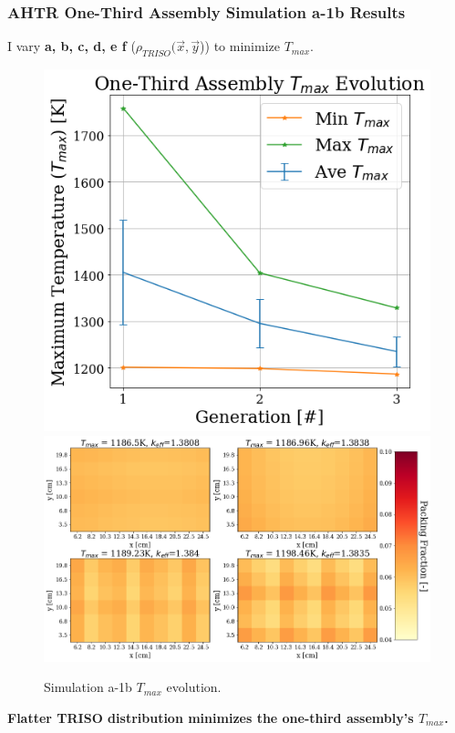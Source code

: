 \begin{frame}
    \frametitle{AHTR One-Third Assembly Simulation a-1b Results}
    I vary \textbf{a, b, c, d, e f} ($\rho_{TRISO}(\vec{x}, \vec{y}$))
    to minimize $T_{max}$. 
    \begin{figure}
        \includegraphics[width=0.39\linewidth]{figures/assem-obj-1-temp-evol-pres.png} 
        \includegraphics[width=0.59\linewidth]{../docs/figures/assem-obj-1-temp-final.png}
        \caption{Simulation a-1b $T_{max}$ evolution.}
    \end{figure}
    \textbf{Flatter TRISO distribution minimizes the one-third assembly's 
    $T_{max}$.}
\end{frame}

